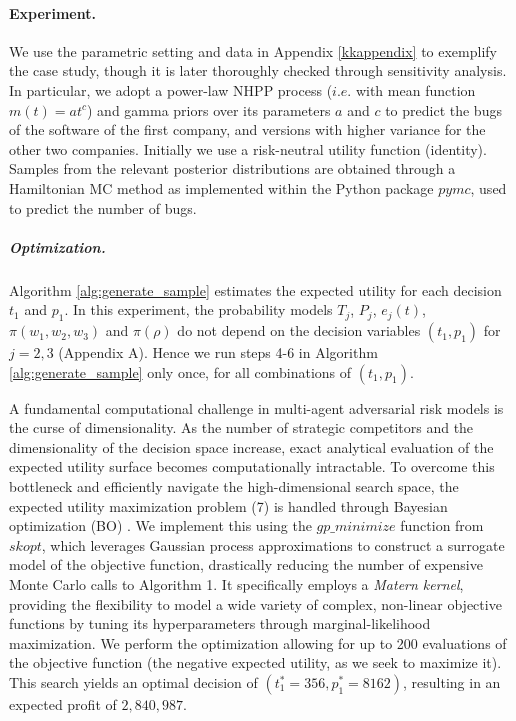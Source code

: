\documentclass[a4paper,fleqn, 11pt]{cas-sc}
\begin{document}
\paragraph{{\bf Experiment.}}
We use the parametric setting and data in 
Appendix \ref{kkappendix} to exemplify the case study, though 
 it is later thoroughly checked through sensitivity analysis. 
In particular, we adopt a power-law NHPP process ($i.e.$ with mean function $m(t)=at^c$) and gamma priors over its parameters $a$ and $c$ to predict the bugs of the software of the first company, and versions with higher variance for the other two companies. Initially we use a risk-neutral utility function (identity). Samples from the relevant posterior distributions are obtained through a Hamiltonian MC method \citep{nuts} 
  as implemented within the Python package $pymc$, used to predict the number of bugs. 

 \subparagraph{{\bf Optimization.}} Algorithm \ref{alg:generate_sample} estimates the expected utility for each decision $t_1$ and $p_1$.
  In this experiment, the probability models $T_j$, $P_j$, 
 $e_j(t)$, $\pi(w_1, w_2 , w_3)$ and $\pi(\rho)$ do not depend on 
 the decision variables $(t_1, p_1)$ for $j=2, 3$ (Appendix A). Hence we  
   run steps 4-6 in Algorithm \ref{alg:generate_sample} only once, for all combinations of $(t_1, p_1)$.
  
A fundamental computational challenge in multi-agent adversarial risk models is the curse of dimensionality. As the number of strategic competitors and the dimensionality of the decision space increase, exact analytical evaluation of the expected utility surface becomes computationally intractable. To overcome this bottleneck and efficiently navigate the high-dimensional search space, the expected utility maximization problem (7) is handled through Bayesian optimization (BO) \citep{gramacy}. We implement this using the $gp\_minimize$ function from $skopt$, which leverages Gaussian process approximations to construct a surrogate model of the objective function, drastically reducing the number of expensive Monte Carlo calls to Algorithm 1. 
It specifically employs a \textit{Matern kernel}, providing the flexibility to model a wide variety of complex, non-linear objective functions by tuning its hyperparameters through marginal-likelihood maximization. We perform the optimization allowing for up to 200 evaluations of the objective function (the negative expected utility, as we seek to maximize it). This search yields an optimal decision of $(t_1^* =356, p_1^* =8162)$, resulting in an expected profit of $2,840,987$.
\end{document}

